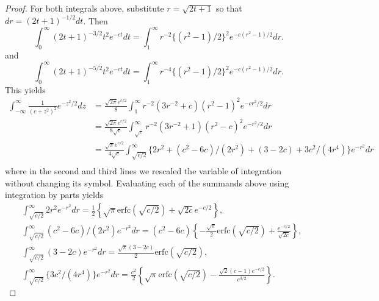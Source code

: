 \documentclass[12pt]{article}
\begin{document}
\begin{proof}
For both integrals above, substitute $r = \sqrt{2t+1}$ so that $dr = (2t+1)^{-1/2} dt$. Then
\begin{equation*}
    \int_0^\infty (2t+1)^{-3/2}t^2 e^{-ct} dt = \int_1^\infty r^{-2} \{(r^2-1)/2\}^2 e^{-c(r^2-1)/2} dr.
\end{equation*}
and
\begin{equation*}
    \int_0^\infty (2t+1)^{-5/2}t^2 e^{-ct} dt = \int_1^\infty r^{-4} \{(r^2-1)/2\}^2 e^{-c(r^2-1)/2} dr.
\end{equation*}
This yields
\begin{equation*}
    \begin{aligned}
        \int_{-\infty}^\infty \frac{1}{(c + z^2)^{2}}e^{-z^2/2} dz &= \frac{\sqrt{2\pi} e^{c/2}}{8}\int_1^\infty r^{-2} (3r^{-2}+c) (r^2-1)^2 e^{-cr^2/2} dr \\
        &= \frac{\sqrt{2\pi} e^{c/2}}{8 \sqrt{c}}\int_{\sqrt{c}}^\infty r^{-2}(3r^{-2}+1) (r^2-c)^2 e^{-r^2/2} dr \\
        &= \frac{\sqrt{\pi} e^{c/2}}{4 \sqrt{c}}\int_{\sqrt{c/2}}^\infty \{2r^2 + (c^2-6c)/(2r^2) + (3-2c) + 3c^2/(4r^4)\} e^{-r^2} dr \\
    \end{aligned}
\end{equation*}
where in the second and third lines we rescaled the variable of integration without changing its symbol. Evaluating each of the summands above using integration by parts yields
\begin{equation*}
    \begin{aligned}
        &\int_{\sqrt{c/2}}^\infty 2 r^2 e^{-r^2} dr = \frac{1}{2}\left\{\sqrt{\pi} \mathrm{erfc}(\sqrt{c/2}) + \sqrt{2c} e^{-c/2} \right\},\\
        &\int_{\sqrt{c/2}}^\infty (c^2-6c)/(2r^2) e^{-r^2} dr = (c^2-6c)\left\{-\frac{\sqrt{\pi}}{2} \mathrm{erfc}(\sqrt{c/2}) + \frac{e^{-c/2}}{\sqrt{2c}}\right\},\\
        &\int_{\sqrt{c/2}}^\infty (3 - 2c) e^{-r^2} dr = \frac{\sqrt{\pi}(3-2c)}{2} \mathrm{erfc}(\sqrt{c/2}),\\
        &\int_{\sqrt{c/2}}^\infty \{3c^2/(4r^4)\} e^{-r^2} dr = \frac{c^2}{2} \left\{\sqrt{\pi} \mathrm{erfc}(\sqrt{c/2}) - \frac{\sqrt{2}(c-1)e^{-c/2}}{c^{3/2}}\right\}.
    \end{aligned}
\end{equation*} 


\end{proof}
\end{document}
